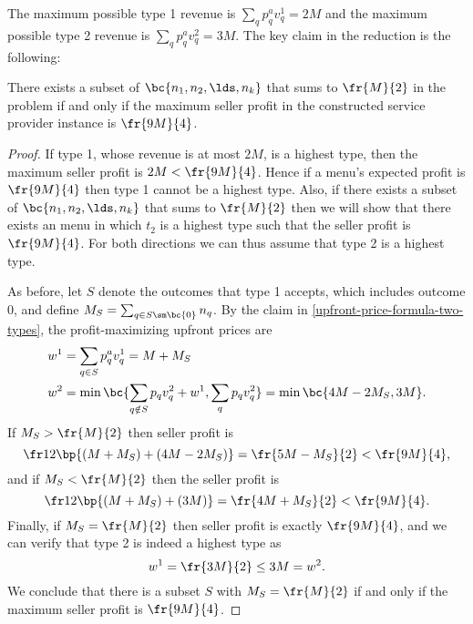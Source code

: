 The maximum possible type 1 revenue is $\sum_q p^a_q v^1_q = 2M$ and the maximum possible type 2 revenue is $\sum_q p^a_q v^2_q = 3M.$ The key claim in the reduction is the following:

\begin{claim*} \label{partition-revenue}
    There exists a subset of $\bc{n_1,n_2,\lds,n_k}$ that sums to $\fr{M}{2}$ in the  problem if and only if the maximum seller profit in the constructed service provider instance is $\fr{9M}{4}$.
\end{claim*}

\begin{proof}
If type 1, whose revenue is at most $2M$, is a highest type, then the maximum seller profit is $2M < \fr{9M}{4}$. Hence if a menu's expected profit is $\fr{9M}{4}$ then type 1 cannot be a highest type. Also, if there exists a subset of $\bc{n_1,n_2,\lds,n_k}$ that sums to $\fr{M}{2}$ then we will show that there exists an menu in which $t_2$ is a highest type such that the seller profit is $\fr{9M}{4}$. For both directions we can thus assume that type 2 is a highest type.


\newcommand{\Szero}{S\sm \bc{0}}

As before, let $S$ denote the outcomes that type 1 accepts, which includes outcome 0, and define $M_S = \sum_{q\in \Szero} n_q$. By the claim in \cref{upfront-price-formula-two-types}, the profit-maximizing upfront prices are
\begin{align*}
    w^1 &= \sum_{q\in S} p^a_q v^1_q = M + M_S \\
    w^2 &=  \min\bc{\sum_{q\notin S} p_q v^2_q + w^1, \sum_q p_q v^2_q}
    = \min\bc{4M - 2M_S, 3M}.
\end{align*}
If $M_S > \fr{M}{2}$ then seller profit is $$\fr12 \bp{(M + M_S) + (4M - 2M_S)} = \fr{5M - M_S}{2} < \fr{9M}{4},$$ and if $M_S < \fr{M}{2}$ then the seller profit is $$\fr12\bp{(M + M_S) + (3M)} = \fr{4M + M_S}{2} < \fr{9M}{4}.$$ Finally, if $M_S = \fr{M}{2}$ then seller profit is exactly $\fr{9M}{4}$, and we can verify that type 2 is indeed a highest type as $$w^1 = \fr{3M}{2} \le 3M = w^2.$$ We conclude that there is a subset $S$ with $M_S = \fr{M}{2}$ if and only if the maximum seller profit is $\fr{9M}{4}$.
\end{proof}

